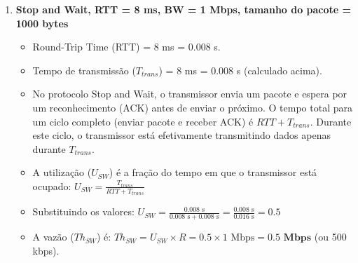\begin{enumerate}[label=\alph*.]
    \item \textbf{Stop and Wait, RTT = 8 ms, BW = 1 Mbps, tamanho do pacote = 1000 bytes}
    \begin{itemize}
        \item Round-Trip Time (RTT) = 8 ms = 0.008 s.
        \item Tempo de transmissão ($T_{trans}$) = 8 ms = 0.008 s (calculado acima).
        \item No protocolo Stop and Wait, o transmissor envia um pacote e espera por um reconhecimento (ACK) antes de enviar o próximo. O tempo total para um ciclo completo (enviar pacote e receber ACK) é $RTT + T_{trans}$. Durante este ciclo, o transmissor está efetivamente transmitindo dados apenas durante $T_{trans}$.
        \item A utilização ($U_{SW}$) é a fração do tempo em que o transmissor está ocupado:
        $U_{SW} = \frac{T_{trans}}{RTT + T_{trans}}$
        \item Substituindo os valores:
        $U_{SW} = \frac{0.008 \text{ s}}{0.008 \text{ s} + 0.008 \text{ s}} = \frac{0.008 \text{ s}}{0.016 \text{ s}} = 0.5$
        \item A vazão ($Th_{SW}$) é:
        $Th_{SW} = U_{SW} \times R = 0.5 \times 1 \text{ Mbps} = \mathbf{0.5 \text{ Mbps}}$ (ou 500 kbps).
    \end{itemize}

    \vspace{0.3cm}


\end{enumerate}
